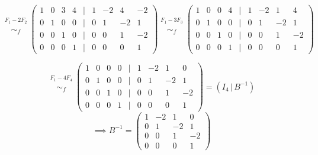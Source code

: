 \documentclass[a4paper,12pt]{article}
\begin{document}
\begin{ejercicio}[title=Ejercicio 14]
\[
\overset{\substack{F_1 - 2F_2 \\ {}}}{\sim_f}
\begin{pmatrix}
1 & 0 & 3 & 4 &\Big|& 1 & -2 & 4 & -2\\
0 & 1 & 0 & 0 &\Big|& 0 & 1 & -2 & 1\\
0 & 0 & 1 & 0 &\Big|& 0 & 0 & 1 & -2\\
0 & 0 & 0 & 1 &\Big|& 0 & 0 & 0 & 1
\end{pmatrix}
\overset{\substack{F_1 - 3F_3 \\ {}}}{\sim_f}
\begin{pmatrix}
1 & 0 & 0 & 4 &\Big|& 1 & -2 & 1 & 4\\
0 & 1 & 0 & 0 &\Big|& 0 & 1 & -2 & 1\\
0 & 0 & 1 & 0 &\Big|& 0 & 0 & 1 & -2\\
0 & 0 & 0 & 1 &\Big|& 0 & 0 & 0 & 1
\end{pmatrix}
\]

\[
\overset{\substack{F_1 - 4F_4 \\ {}}}{\sim_f}
\begin{pmatrix}
1 & 0 & 0 & 0 &\Big|& 1 & -2 & 1 & 0\\
0 & 1 & 0 & 0 &\Big|& 0 & 1 & -2 & 1\\
0 & 0 & 1 & 0 &\Big|& 0 & 0 & 1 & -2\\
0 & 0 & 0 & 1 &\Big|& 0 & 0 & 0 & 1
\end{pmatrix}
= (I_4 \,|\, B^{-1})
\]
\vspace{0.5em}
\[
\implies 
\boxed{
B^{-1} =
\begin{pmatrix}
1 & -2 & 1 & 0\\
0 & 1 & -2 & 1\\
0 & 0 & 1 & -2\\
0 & 0 & 0 & 1
\end{pmatrix}
}
\]
\end{ejercicio}
\end{document}
